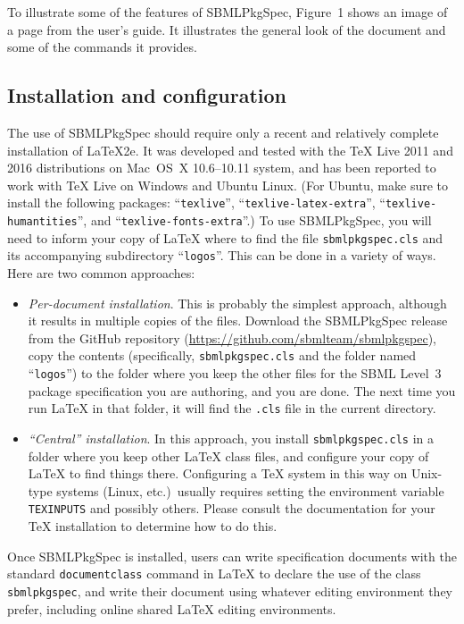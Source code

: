 \documentclass{bmcart}
\newcommand{\sbmlpkg}{SBMLPkgSpec}
\newcommand{\sbmlpkgfile}{\texttt{sbmlpkgspec.cls}}
\newcommand{\githuburl}{https://github.com/sbmlteam/sbmlpkgspec}
\begin{document}
To illustrate some of the features of \sbmlpkg{}, Figure~1 shows an image of a page from the user's guide.  It illustrates the general look of the document and some of the commands it provides.


\subsection*{Installation and configuration}

The use of \sbmlpkg{} should require only a recent and relatively complete installation of LaTeX2e.  It was developed and tested with the TeX Live 2011 and 2016 distributions on Mac~OS~X 10.6--10.11 system, and has been reported to work with TeX Live on Windows and Ubuntu Linux.  (For Ubuntu, make sure to install the following packages: ``\texttt{texlive}'', ``\texttt{texlive-latex-extra}'', ``\texttt{texlive-humantities}'', and ``\texttt{texlive-fonts-extra}''.)  To use \sbmlpkg, you will need to inform your copy of LaTeX where to find the file \sbmlpkgfile{} and its accompanying subdirectory ``\texttt{logos}''.  This can be done in a variety of ways.  Here are two common approaches:

\begin{itemize}

\item \emph{Per-document installation}.  This is probably the simplest approach, although it results in multiple copies of the files.  Download the \sbmlpkg{} release from the GitHub repository (\url{\githuburl}), copy the contents (specifically, \sbmlpkgfile{} and the folder named ``\texttt{logos}'') to the folder where you keep the other files for the SBML Level~3 package specification you are authoring, and you are done.  The next time you run LaTeX in that folder, it will find the \texttt{.cls} file in the current directory.

\item \emph{``Central'' installation}.  In this approach, you install \sbmlpkgfile{} in a folder where you keep other LaTeX class files, and configure your copy of LaTeX to find things there.  Configuring a TeX system in this way on Unix-type systems (Linux, etc.)\ usually requires setting the environment variable \texttt{TEXINPUTS} and possibly others.  Please consult the documentation for your TeX installation to determine how to do this.

\end{itemize}

Once \sbmlpkg{} is installed, users can write specification documents with the standard \texttt{documentclass} command in LaTeX to declare the use of the class \texttt{sbmlpkgspec}, and write their document using whatever editing environment they prefer, including online shared LaTeX editing environments.
\end{document}
